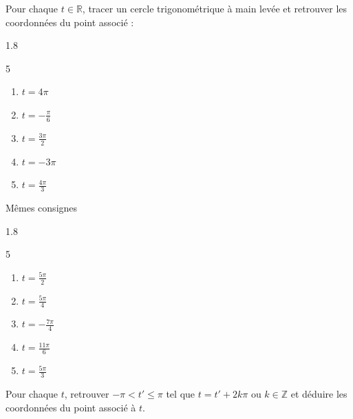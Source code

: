 \documentclass[main.tex]{subfiles}
\begin{document}
\begin{exercise}Pour chaque $t\in\mathbb{R}$, tracer un cercle trigonométrique à main levée et retrouver les coordonnées du point associé  :
	\vspace{-0.75em}
	\begin{spacing}{1.8}
		\begin{multicols}{5} 
			\begin{enumerate}[label={\arabic*)},leftmargin=*]
				\item $t=4\pi$
				\item $t=-\tfrac{\pi}{6}$ 
				\item $t=\tfrac{3\pi}{2}$ 
				\item $t=-3\pi$  
				\item $t=\tfrac{4\pi}{3}$ 
			\end{enumerate}
		\end{multicols}\vspace{-2.75em}
	\end{spacing}	
\end{exercise}
\begin{exercise}[entrainement] Mêmes consignes
	\vspace{-0.75em}
	\begin{spacing}{1.8}
		\begin{multicols}{5} 
			\begin{enumerate}[label={\arabic*)},leftmargin=*]
				\item $t=\tfrac{5\pi}{2}$ 
				\item $t=\tfrac{5\pi}{4}$ 
				\item $t=-\tfrac{7\pi}{4}$ 
				\item $t=\tfrac{11\pi}{6}$ 
				\item $t=\tfrac{5\pi}{3}$ 
			\end{enumerate}
		\end{multicols}\vspace{-2.75em}
	\end{spacing}	
\end{exercise}
\begin{example}[modèle] Pour chaque $t$, retrouver $-\pi< t'\leqslant \pi$ tel que $t=t'+2k\pi$ ou $k\in\mathbb{Z}$ et déduire les coordonnées du point associé à $t$. 
\end{example}
\end{document}
